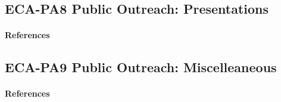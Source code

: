 \newpage
\subsection{ECA-PA8 Public Outreach: Presentations}
\paragraph{References}
\begin{refsection}
\nocite{moore_biological_2021, moore_how_2021,moore_presentation_2021}
\nocite{grasela_preliminary_2022}
\nocite{moore_invasive_2022}
\begin{comment}
\paragraph{Plans for 15JUN2021-14JUN2022}
I will continue to create and deliver presentations.

\paragraph{Plans for 15JUN2022-14JUN2023}
I will continue to create and deliver presentations.
\end{comment}

\printbibliography[heading=none]
\end{refsection}

\subsection{ECA-PA9 Public Outreach: Miscelleaneous}
\begin{refsection}
\nocite{moore_what_2022}

\paragraph{References}
\begin{comment}
\paragraph{Plans for 15JUN2021-14JUN2022}
None

\paragraph{Plans for 15JUN2022-14JUN2023}
None
\end{comment}
\printbibliography[heading=none]
\end{refsection}

